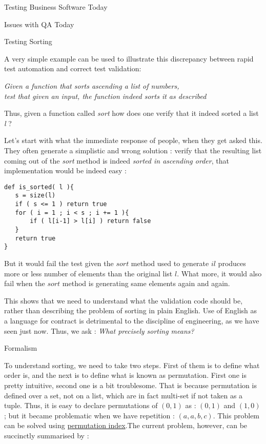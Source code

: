 \begin{section}{Testing Business Software Today}
\begin{subsection}{Issues with QA Today}
\end{subsection}

\begin{subsection}{Testing Sorting}

A very simple example can be used to illustrate this discrepancy between rapid test automation and correct test validation:

\begin{center}
\emph{Given a function that sorts ascending a list of numbers,\\ test that given an input, the function indeed sorts it as described}
\end{center}


Thus, given a function called \emph{sort} how does one verify that it indeed sorted a list \emph{l} ?  

Let's start with what the immediate response of people, when they get asked this. They often generate  a  simplistic and wrong solution :  verify that the resulting list coming out of the \emph{sort} method is indeed \emph{sorted in ascending order}, that implementation would be indeed easy :

\begin{lstlisting}[style=JexlStyle]
def is_sorted( l ){
   s = size(l) 
   if ( s <= 1 ) return true 
   for ( i = 1 ; i < s ; i += 1 ){
       if ( l[i-1] > l[i] ) return false 
   }
   return true 
}
\end{lstlisting}


But it would fail the test given the $sort$ method used to generate $il$ produces more or less number of elements 
than the original list $l$. What more, it would also fail when the $sort$ method is generating same elements again and again.

This shows that we need to understand what the validation code should be, rather than describing the problem of sorting in plain English. Use of English as a language for contract is detrimental to the discipline of engineering, as we have seen just now. Thus, we ask : 
\emph{ What precisely sorting means? }

\end{subsection}

\begin{subsection}{Formalism}

To understand sorting, we need to take two steps. First of them is to define what order is, and the next is to define what is known as permutation. First one is pretty intuitive, second one is a bit troublesome. That is because permutation is defined over a set, not on a list, which are in fact multi-set if not taken as a tuple. Thus, it is easy to declare permutations of  $(0, 1)$ as : $(0,1)$ and $(1,0)$ ; but it became problematic when we have repetition : $(a,a,b,c)$.  This problem can be solved using 
\href{http://mathworld.wolfram.com/PermutationIndex.html}{permutation index}.The current problem, however,  can be succinctly summarised by :


\end{subsection}
\end{section}
